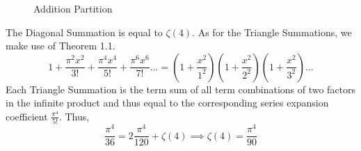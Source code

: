 \documentclass[12pt]{article}
\begin{document}
\begin{figure}[ht]
	\caption{Addition Partition}
\end{figure}
\newline
The Diagonal Summation is equal to \(\zeta(4)\).
As for the Triangle Summations, we make use of Theorem 1.1.
\[1+\frac{\pi^2x^2}{3!}+\frac{\pi^4x^4}{5!}+\frac{\pi^6x^6}{7!}...=\left(1+\frac{x^2}{1^2}\right)\left(1+\frac{x^2}{2^2}\right)\left(1+\frac{x^2}{3^2}\right)...\]
Each Triangle Summation is the term sum of all term combinations of two factors in the infinite product and thus equal to the corresponding series expansion coefficient \(\frac{\pi^4}{5!}\). Thus,
\[\frac{\pi^4}{36}=2\frac{\pi^4}{120}+\zeta(4)\implies\zeta(4)=\frac{\pi^4}{90}\]
\newpage
\end{document}
